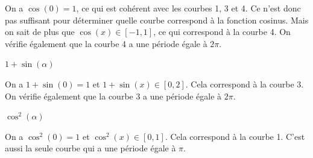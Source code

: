 
\begin{corrige}
On a $\cos(0)=1$, ce qui est cohérent avec les courbes 1, 3 et 4. Ce n'est donc pas suffisant pour déterminer quelle courbe correspond à la fonction cosinus. Mais on sait de plus que $\cos(x)\in[-1,1]$, ce qui correspond à la courbe 4. On vérifie également que la courbe 4 a une période égale à $2\pi$.
\end{corrige}




\begin{enonce}
$1+\sin(\alpha)$
\end{enonce}


\begin{corrige}
On a $1+\sin(0)=1$ et $1+\sin(x)\in[0,2]$. Cela correspond à la courbe 3. On vérifie également que la courbe 3 a une période égale à $2\pi$.
\end{corrige}




\begin{enonce}
$\cos^2(\alpha)$
\end{enonce}


\begin{corrige}
On a $\cos^2(0)=1$ et $\cos^2(x)\in[0,1]$. Cela correspond à la courbe 1. C'est aussi la seule courbe qui a une période égale à $\pi$.
\end{corrige}


\finEntrainement







